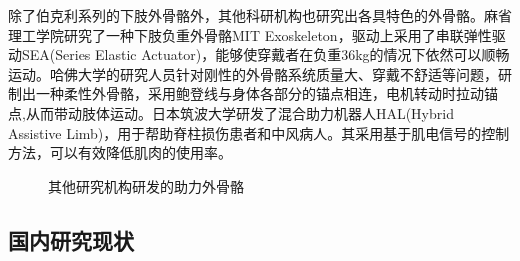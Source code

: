 除了伯克利系列的下肢外骨骼外，其他科研机构也研究出各具特色的外骨骼。麻省理工学院研究了一种下肢负重外骨骼MIT Exoskeleton\cite{p11}，驱动上采用了串联弹性驱动SEA(Series Elastic Actuator)，能够使穿戴者在负重36kg的情况下依然可以顺畅运动。哈佛大学的研究人员针对刚性的外骨骼系统质量大、穿戴不舒适等问题，研制出一种柔性外骨骼\cite{p12}，采用鲍登线与身体各部分的锚点相连，电机转动时拉动锚点,从而带动肢体运动。日本筑波大学研发了混合助力机器人HAL\cite{p13}(Hybrid Assistive Limb)，用于帮助脊柱损伤患者和中风病人。其采用基于肌电信号的控制方法，可以有效降低肌肉的使用率。
\begin{figure}[htb]
    \quad
    \caption{其他研究机构研发的助力外骨骼}
    \label{fig:subfigss}
\end{figure}

\subsection{国内研究现状}

